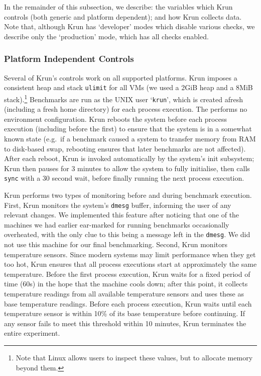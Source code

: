 \documentclass[preprint,numbers,10pt]{sigplanconf}
\newcommand{\krun}{Krun\xspace}
\begin{document}
In the remainder of this subsection, we describe: the variables which \krun
controls (both generic and platform dependent); and how \krun collects data.
Note that, although \krun has `developer' modes which disable various checks,
we describe only the `production' mode, which has all checks enabled.


\subsubsection{Platform Independent Controls}

Several of \krun's controls work on all supported platforms. \krun imposes a
consistent heap and stack \texttt{ulimit} for all
VMs (we used a 2GiB heap and a 8MiB stack).\footnote{Note that Linux allows users
to inspect these values, but to allocate memory beyond them.} Benchmarks are run
as the UNIX user `\texttt{krun}', which is created afresh (including a fresh
home directory) for each process execution. The performs no environment
configuration.
\krun reboots the system before each process execution (including
before the first) to ensure that the system is in a somewhat known state
(e.g.~if a benchmark caused a system to transfer memory from RAM to disk-based swap,
rebooting ensures that later benchmarks are not affected). After each reboot, \krun
is invoked automatically by the system's init subsystem; \krun then pauses for
3 minutes to allow the system to fully initialise, then calls \texttt{sync}
with a 30 second wait, before finally running the next process execution.

\krun performs two types of monitoring before and during benchmark execution.
First, \krun monitors the system's \texttt{dmesg} buffer, informing the user of
any relevant changes. We implemented this feature after noticing that one of the
machines we had earlier ear-marked for running benchmarks occasionally
overheated, with the only clue to this being a message left in the \texttt{dmesg}.
We did not use this machine for our final benchmarking.
Second, \krun monitors temperature sensors. Since modern systems may limit
performance when they get too hot, \krun ensures that all process executions
start at approximately the same temperature. Before the first process execution,
\krun waits for a fixed period of time (60s) in the hope that the machine
cools down; after this point, it collects temperature
readings from all available temperature sensors and uses these as
base temperature readings. Before each process execution, \krun
waits until each temperature sensor is within 10\%{} of its base temperature
before continuing. If any sensor fails to meet this threshold
within 10 minutes, \krun terminates the entire experiment.
\end{document}
